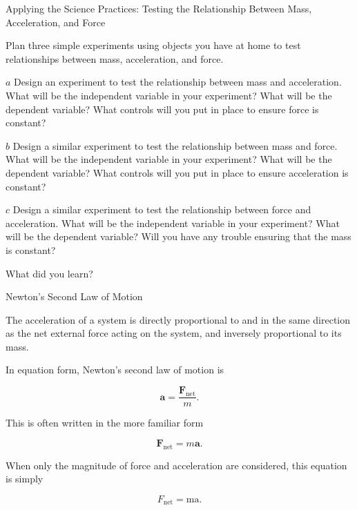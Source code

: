 \documentclass[
]{book}
\newenvironment{note}{}{}
\begin{document}
\hypertarget{fs-id1452745}{}
\begin{note}

Applying the Science Practices: Testing the Relationship Between Mass,
Acceleration, and Force

Plan three simple experiments using objects you have at home to test
relationships between mass, acceleration, and force.

\(a\) Design an experiment to test the relationship between mass and
acceleration. What will be the independent variable in your experiment?
What will be the dependent variable? What controls will you put in place
to ensure force is constant?

\(b\) Design a similar experiment to test the relationship between mass
and force. What will be the independent variable in your experiment?
What will be the dependent variable? What controls will you put in place
to ensure acceleration is constant?

\(c\) Design a similar experiment to test the relationship between force
and acceleration. What will be the independent variable in your
experiment? What will be the dependent variable? Will you have any
trouble ensuring that the mass is constant?

What did you learn?

\end{note}

\hypertarget{fs-id1463122}{}
\begin{note}

Newton's Second Law of Motion

The acceleration of a system is directly proportional to and in the same
direction as the net external force acting on the system, and inversely
proportional to its mass.

In equation form, Newton's second law of motion is

\leavevmode\hypertarget{eip-id1628753}{}%
\[{\textbf{a} = \frac{\textbf{F}_{\text{net}}}{m}}.\]

This is often written in the more familiar form

\leavevmode\hypertarget{eip-id2606927}{}%
\[{\textbf{F}_{\text{net}} = m\textbf{a}}.\]

When only the magnitude of force and acceleration are considered, this
equation is simply

\leavevmode\hypertarget{eip-id1641404}{}%
\[{F_{\text{net}} = \text{ma}}.{}\]

\end{note}
\end{document}
